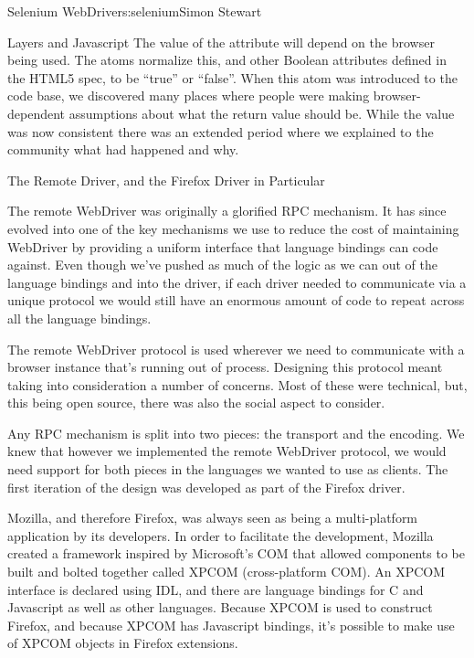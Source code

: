 \begin{aosachapter}{Selenium WebDriver}{s:selenium}{Simon Stewart}
\begin{aosasect1}{Layers and Javascript}
\noindent The value of the  attribute will depend on the browser
being used. The atoms normalize this, and other Boolean attributes
defined in the HTML5 spec, to be ``true'' or ``false''. When this atom
was introduced to the code base, we discovered many places where
people were making browser-dependent assumptions about what the return
value should be. While the value was now consistent there was an
extended period where we explained to the community what had happened
and why.

\end{aosasect1}

\begin{aosasect1}{The Remote Driver, and the Firefox Driver in Particular}

The remote WebDriver was originally a glorified RPC mechanism. It has
since evolved into one of the key mechanisms we use to reduce the cost
of maintaining WebDriver by providing a uniform interface that
language bindings can code against. Even though we've pushed as much
of the logic as we can out of the language bindings and into the
driver, if each driver needed to communicate via a unique protocol we
would still have an enormous amount of code to repeat across all the
language bindings.

The remote WebDriver protocol is used wherever we need to communicate
with a browser instance that's running out of process.  Designing this
protocol meant taking into consideration a number of concerns. Most of
these were technical, but, this being open source, there was also the
social aspect to consider.

Any RPC mechanism is split into two pieces: the transport and the
encoding. We knew that however we implemented the remote WebDriver
protocol, we would need support for both pieces in the languages we
wanted to use as clients. The first iteration of the design was
developed as part of the Firefox driver.

Mozilla, and therefore Firefox, was always seen as being a
multi-platform application by its developers. In order to facilitate
the development, Mozilla created a framework inspired by Microsoft's
COM that allowed components to be built and bolted together called
XPCOM (cross-platform COM). An XPCOM interface is declared using IDL,
and there are
language bindings for C and Javascript as well as other languages. Because
XPCOM is used to construct Firefox, and because XPCOM has Javascript
bindings, it's possible to make use of XPCOM objects in Firefox
extensions.


\end{aosasect1}
\end{aosachapter}
